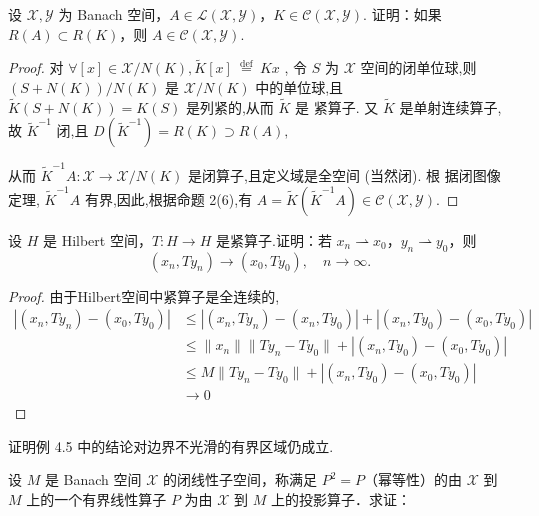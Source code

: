 \documentclass[lang=cn,newtx,10pt,scheme=chinese,thmcnt=chapter]{elegantbook}
\begin{document}
\begin{problemset}
  \item 设 \(\mathcal{X}, \mathcal{Y}\) 为 Banach 空间，\(A \in  \mathcal{L}(\mathcal{X},\mathcal{Y})\)，\(K \in  \mathcal{C}(\mathcal{X},\mathcal{Y})\).  
  证明：如果 \(R(A) \subset R(K)\)，则 \(A \in  \mathcal{C}(\mathcal{X},\mathcal{Y})\).
\begin{proof}
 对 \( \forall \left\lbrack  x\right\rbrack   \in  \mathcal{X}/N\left( K\right) ,\widetilde{K}\left\lbrack  x\right\rbrack  \overset{\text{ def }}{ = }{Kx} \) , 令 \( S \) 为 \( \mathcal{X} \) 空间的闭单位球,则 \( (S + N\left( K\right) )/N(K)\) 是
\( \mathcal{X}/N\left( K\right) \) 中的单位球,且 \( \widetilde{K}\left( {S + N\left( K\right) }\right)  = K\left( S\right) \) 是列紧的,从而 \( \widetilde{K} \) 是
紧算子. 又 \( \widetilde{K} \) 是单射连续算子,故 \( {\widetilde{K}}^{-1} \) 闭,且
\( D\left( {\widetilde{K}}^{-1}\right)  = R\left( K\right)  \supset  R\left( A\right) , \)

从而 \( {\widetilde{K}}^{-1}A : \mathcal{X} \rightarrow  \mathcal{X}/N\left( K\right) \) 是闭算子,且定义域是全空间 (当然闭). 根
据闭图像定理, \( {\widetilde{K}}^{-1}A \) 有界,因此,根据命题 2(6),有
\( A = {\widetilde{K}}{\left( {\widetilde{K}}^{-1}A\right) } \in  \mathcal{C}\left( {\mathcal{X},\mathcal{Y}}\right) . \)
\end{proof}
  \item 设 \(H\) 是 Hilbert 空间，\(T : H \to H\) 是紧算子.证明：若 \({x}_{n} \rightharpoonup  {x}_{0}\)，\({y}_{n} \rightharpoonup  {y}_{0}\)，则\[
  (x_{n}, T y_{n}) \rightarrow (x_{0}, T y_{0}), \quad n \rightarrow \infty.
  \]
\begin{proof}
    由于Hilbert空间中紧算子是全连续的,\begin{equation*}
        \begin{aligned}
            \left| (x_{n}, T y_{n}) - (x_{0}, T y_{0})\right|&\leqslant   \left| (x_{n}, T y_{n}) - (x_{n}, T y_{0})\right|+ \left| (x_{n}, T y_{0}) - (x_{0}, T y_{0})\right|\\&\leqslant   \|x_n\|\|Ty_n-Ty_0\|+ \left| (x_{n}, T y_{0}) - (x_{0}, T y_{0})\right|\\
       &\leqslant   M\|Ty_n-Ty_0\|+ \left| (x_{n}, T y_{0}) - (x_{0}, T y_{0})\right|\\&\to 0
        \end{aligned}
    \end{equation*}
\end{proof}
  \item 证明例 4.5 中的结论对边界不光滑的有界区域仍成立.
  \item  设 $M$ 是 Banach 空间 $\mathcal{X}$ 的闭线性子空间，称满足 $P^2=P$（幂等性）的由 $\mathcal{X}$ 到 $M$ 上的一个有界线性算子 $P$ 为由 $\mathcal{X}$ 到 $M$ 上的投影算子．求证：
  

\end{problemset}
\end{document}
